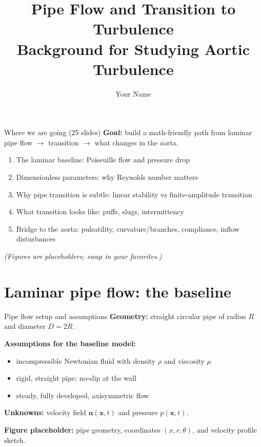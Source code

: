 \documentclass[aspectratio=169]{beamer}
\title[Pipe Flow \& Transition]{Pipe Flow and Transition to Turbulence\\Background for Studying Aortic Turbulence}
\author{Your Name}
\date{}
\newcommand{\x}{\bm{x}}
\newcommand{\uu}{\bm{u}}
\newcommand{\pp}{p}
\begin{document}
\begin{frame}
  \titlepage
\end{frame}

\begin{frame}{Where we are going (25 slides)}
\textbf{Goal:} build a math-friendly path from laminar pipe flow $\to$ transition $\to$ what changes in the aorta.

\begin{enumerate}
  \item The laminar baseline: Poiseuille flow and pressure drop
  \item Dimensionless parameters: why Reynolds number matters
  \item Why pipe transition is subtle: linear stability vs finite-amplitude transition
  \item What transition looks like: puffs, slugs, intermittency
  \item Bridge to the aorta: pulsatility, curvature/branches, compliance, inflow disturbances
\end{enumerate}

\vspace{0.5em}
\textit{(Figures are placeholders; swap in your favorites.)}
\end{frame}

\section{Laminar pipe flow: the baseline}

\begin{frame}{Pipe flow setup and assumptions}
\textbf{Geometry:} straight circular pipe of radius $R$ and diameter $D=2R$.

\textbf{Assumptions for the baseline model:}
\begin{itemize}
  \item incompressible Newtonian fluid with density $\rho$ and viscosity $\mu$
  \item rigid, straight pipe; no-slip at the wall
  \item steady, fully developed, axisymmetric flow
\end{itemize}

\textbf{Unknowns:} velocity field $\uu(\x,t)$ and pressure $\pp(\x,t)$.

\vspace{0.8em}
\textbf{Figure placeholder:} pipe geometry, coordinates $(x,r,\theta)$, and velocity profile sketch.
\end{frame}
\end{document}
